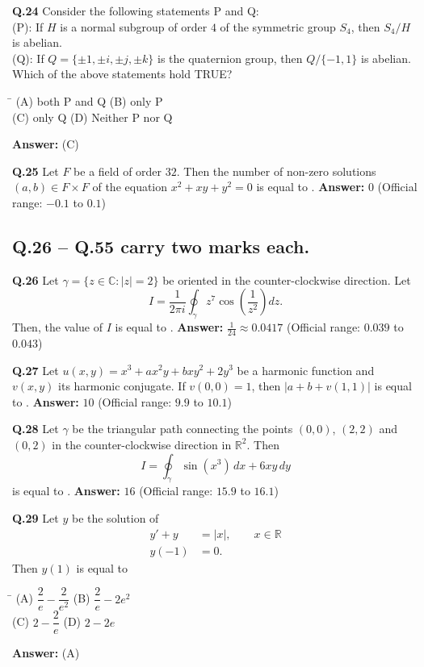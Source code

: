 \documentclass[11pt,a4paper]{article}
\newcommand{\optsfourA}[4]{%
  \begin{tabbing}
    \hspace{0.48\linewidth}\=\kill
    (A) #1 \> (B) #2 \\[2pt]
    (C) #3 \> (D) #4
  \end{tabbing}%
}
\newcommand{\ans}[1]{\textbf{Answer:} #1\par\medskip}
\begin{document}
\textbf{Q.24} Consider the following statements P and Q:\\
(P): If $H$ is a normal subgroup of order $4$ of the symmetric group $S_4$, then $S_4 / H$ is abelian.\\
(Q): If $Q = \{\pm 1, \pm i, \pm j, \pm k\}$ is the quaternion group, then $Q / \{-1, 1\}$ is abelian.\\
Which of the above statements hold TRUE?
\optsfourA{both P and Q}{only P}{only Q}{Neither P nor Q}
\ans{(C)}

\textbf{Q.25} Let $F$ be a field of order $32$. Then the number of non-zero solutions $(a, b) \in F \times F$ of the equation $x^2 + xy + y^2 = 0$ is equal to \underline{\hspace{2cm}}.
\ans{$0$ (Official range: $-0.1$ to $0.1$)}

\subsection*{Q.26 -- Q.55 carry two marks each.}

\textbf{Q.26} Let $\gamma = \{z \in \mathbb{C} : |z| = 2\}$ be oriented in the counter-clockwise direction. Let
\[
  I = \frac{1}{2\pi i} \oint_\gamma z^7 \cos\!\left(\frac{1}{z^2}\right) dz.
\]
Then, the value of $I$ is equal to \underline{\hspace{2cm}}.
\ans{$\frac{1}{24} \approx 0.0417$ (Official range: $0.039$ to $0.043$)}

\textbf{Q.27} Let $u(x, y) = x^3 + a x^2 y + b x y^2 + 2y^3$ be a harmonic function and $v(x, y)$ its harmonic conjugate. If $v(0, 0) = 1$, then $|a + b + v(1, 1)|$ is equal to \underline{\hspace{2cm}}.
\ans{$10$ (Official range: $9.9$ to $10.1$)}

\textbf{Q.28} Let $\gamma$ be the triangular path connecting the points $(0, 0)$, $(2, 2)$ and $(0, 2)$ in the counter-clockwise direction in $\mathbb{R}^2$. Then
\[
  I = \oint_\gamma \sin(x^3)\,dx + 6xy\,dy
\]
is equal to \underline{\hspace{2cm}}.
\ans{$16$ (Official range: $15.9$ to $16.1$)}

\textbf{Q.29} Let $y$ be the solution of
\begin{align*}
  y' + y &= |x|, \qquad x \in \mathbb{R} \\
  y(-1) &= 0.
\end{align*}
Then $y(1)$ is equal to
\optsfourA{$\dfrac{2}{e} - \dfrac{2}{e^2}$}{$\dfrac{2}{e} - 2e^2$}{$2 - \dfrac{2}{e}$}{$2 - 2e$}
\ans{(A)}
\end{document}
